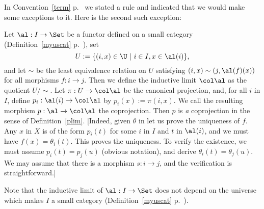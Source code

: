 \documentclass[12pt]{article}
\theoremstyle{remark}
\theoremstyle{definition}
\begin{document}
In Convention~\ref{term} p.~ we stated a rule and indicated that we would make some exceptions to it. Here is the second such exception:

\begin{conv}
Let $\al:I\to\Set$ be a functor defined on a small category (Definition~\ref{myuscat} p.~), set 
$$ 
U:=\{(i,x)\in\U\ |\ i\in I,x\in\al(i)\},
$$ 
and let $\sim$ be the least equivalence relation on $U$ satisfying $(i,x)\sim(j,\al(f)(x))$ for all morphisms $f:i\to j$. Then we define the inductive limit $\col\al$ as the quotient $U/\!\!\sim$. Let $\pi:U\to\col\al$ be the canonical projection, and, for all $i$ in $I$, define $p_i:\al(i)\to\col\al$ by $p_i(x):=\pi(i,x)$. We call the resulting morphism $p:\al\to\col\al$ the coprojection. Then $p$ is \emph{a} coprojection in the sense of Definition~\ref{plim}. [Indeed, given $\theta$ in  let us prove the uniqueness of $f$. Any $x$ in $X$ is of the form $p_i(t)$ for some $i$ in $I$ and $t$ in $\al(i)$, and we must have $f(x)=\theta_i(t)$. This proves the uniqueness. To verify the existence, we must assume $p_i(t)=p_j(u)$ (obvious notation), and derive $\theta_i(t)=\theta_j(u)$. We may assume that there is a morphism $s:i\to j$, and the verification is straightforward.]
\end{conv} 

Note that the inductive limit of $\al:I\to\Set$ does not depend on the universe which makes $I$ a small category (Definition~\ref{myuscat} p.~).



\end{document}
